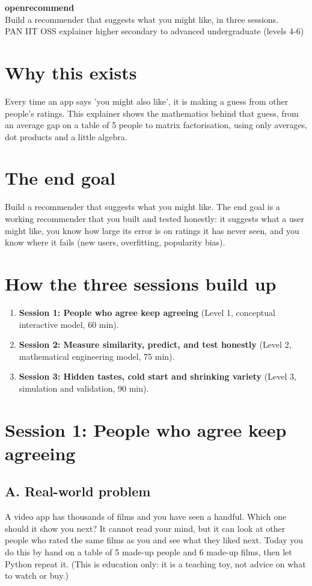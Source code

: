 \documentclass[11pt,a4paper]{article}
\begin{document}
\begin{center}{\LARGE\bfseries openrecommend}\\[0.4em]{\large Build a recommender that suggests what you might like, in three sessions.}\\[0.2em]\small PAN IIT OSS explainer \textbullet{} higher secondary to advanced undergraduate (levels 4-6)\end{center}

\section*{Why this exists}
Every time an app says 'you might also like', it is making a guess from other people's ratings. This explainer shows the mathematics behind that guess, from an average gap on a table of 5 people to matrix factorisation, using only averages, dot products and a little algebra.

\section*{The end goal}
Build a recommender that suggests what you might like. The end goal is a working recommender that you built and tested honestly: it suggests what a user might like, you know how large its error is on ratings it has never seen, and you know where it fails (new users, overfitting, popularity bias).

\section*{How the three sessions build up}
\begin{enumerate}[nosep]
\item \textbf{Session 1: People who agree keep agreeing} (Level 1, conceptual interactive model, 60 min).
\item \textbf{Session 2: Measure similarity, predict, and test honestly} (Level 2, mathematical engineering model, 75 min).
\item \textbf{Session 3: Hidden tastes, cold start and shrinking variety} (Level 3, simulation and validation, 90 min).
\end{enumerate}

\section{Session 1: People who agree keep agreeing}

\subsection*{A. Real-world problem}
A video app has thousands of films and you have seen a handful. Which one should it show you next? It cannot read your mind, but it can look at other people who rated the same films as you and see what they liked next. Today you do this by hand on a table of 5 made-up people and 6 made-up films, then let Python repeat it. (This is education only: it is a teaching toy, not advice on what to watch or buy.)
\end{document}
